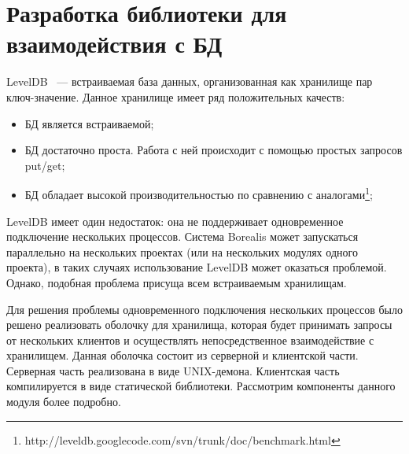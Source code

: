 \section{Разработка библиотеки для взаимодействия с БД}
LevelDB~\cite{leveldb} --- встраиваемая база данных, организованная как хранилище пар ключ-значение. Данное хранилище имеет ряд положительных качеств:
\begin{itemize}
\item БД является встраиваемой;
\item БД достаточно проста. Работа с ней происходит с помощью простых запросов put/get;
\item БД обладает высокой производительностью по сравнению с аналогами\footnote{http://leveldb.googlecode.com/svn/trunk/doc/benchmark.html};
\end{itemize}

LevelDB имеет один недостаток: она не поддерживает одновременное подключение нескольких процессов. Система Borealis может запускаться параллельно на нескольких проектах (или на нескольких модулях одного проекта), в таких случаях использование LevelDB может оказаться проблемой. Однако, подобная проблема присуща всем встраиваемым хранилищам.

Для решения проблемы одновременного подключения нескольких процессов было решено реализовать оболочку для хранилища, которая будет принимать запросы от нескольких клиентов и осуществлять непосредственное взаимодействие с хранилищем. Данная оболочка состоит из серверной и клиентской части. Серверная часть реализована в виде UNIX-демона. Клиентская часть компилируется в виде статической библиотеки. Рассмотрим компоненты данного модуля более подробно.

